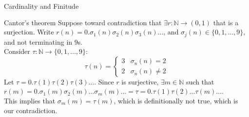 \documentclass[8pt]{extarticle}
\begin{document}
\begin{problem}{Cardinality and Finitude}
\begin{problem}{Cantor's theorem}
      Suppose toward contradiction that $\exists r:\mathbb{N} \rightarrow (0,1)$ that is a surjection. Write $r(n) = 0.\sigma_1(n)\sigma_2(n)\sigma_3(n)\dots$, and $\sigma_j(n) \in \{0,1,\dots,9\}$, and not terminating in $9$s.\\

      Consider $\tau: \mathbb{N} \rightarrow \{0,1,\dots,9\}$:
      \[
        \tau(n) = \begin{cases}
          3 & \sigma_n(n) = 2\\
          2 & \sigma_n(n) \neq 2
        \end{cases}
      \]
      Let $\tau = 0.\tau(1)\tau(2)\tau(3)\dots$. Since $r$ is surjective, $\exists m\in \mathbb{N}$ such that $r(m) = 0.\sigma_1(m)\sigma_2(m)\dots \sigma_m(m)\dots = \tau = 0.\tau(1)\tau(2)\dots\tau(m)\dots$.\\

      This implies that $\sigma_m(m) = \tau(m)$, which is definitionally not true, which is our contradiction.
    \end{problem}
  \end{problem}
\end{document}
